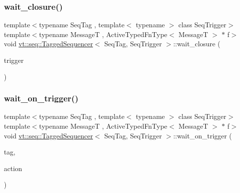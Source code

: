 \mbox{\label{structvt_1_1seq_1_1_tagged_sequencer_ac1ba35f793dcb35a47d4e73ec6ab29d4}} 
\subsubsection{\texorpdfstring{wait\+\_\+closure()}{wait\_closure()}\hspace{0.1cm}{\footnotesize\ttfamily [2/2]}}
{\footnotesize\ttfamily template$<$typename Seq\+Tag , template$<$ typename $>$ class Seq\+Trigger$>$ \\
template$<$typename MessageT , Active\+Typed\+Fn\+Type$<$ Message\+T $>$ $\ast$ f$>$ \\
void \hyperlink{structvt_1_1seq_1_1_tagged_sequencer}{vt\+::seq\+::\+Tagged\+Sequencer}$<$ Seq\+Tag, Seq\+Trigger $>$\+::wait\+\_\+closure (\begin{DoxyParamCaption}\item[{\hyperlink{namespacevt_1_1seq_aa88b0d93284d188be39704024ab58b8f}{Seq\+Non\+Migratable\+Trigger\+Type}$<$ MessageT $>$}]{trigger }\end{DoxyParamCaption})}

\mbox{\label{structvt_1_1seq_1_1_tagged_sequencer_a7d2d5815ae147f286006419aa3180020}} 
\subsubsection{\texorpdfstring{wait\+\_\+on\+\_\+trigger()}{wait\_on\_trigger()}}
{\footnotesize\ttfamily template$<$typename Seq\+Tag , template$<$ typename $>$ class Seq\+Trigger$>$ \\
template$<$typename MessageT , Active\+Typed\+Fn\+Type$<$ Message\+T $>$ $\ast$ f$>$ \\
void \hyperlink{structvt_1_1seq_1_1_tagged_sequencer}{vt\+::seq\+::\+Tagged\+Sequencer}$<$ Seq\+Tag, Seq\+Trigger $>$\+::wait\+\_\+on\+\_\+trigger (\begin{DoxyParamCaption}\item[{\hyperlink{namespacevt_a84ab281dae04a52a4b243d6bf62d0e52}{Tag\+Type} const \&}]{tag,  }\item[{\hyperlink{structvt_1_1seq_1_1_tagged_sequencer_a0210dbd34288d440e0cd51db9d6637bd}{Seq\+Action\+Type}$<$ MessageT $>$}]{action }\end{DoxyParamCaption})}



